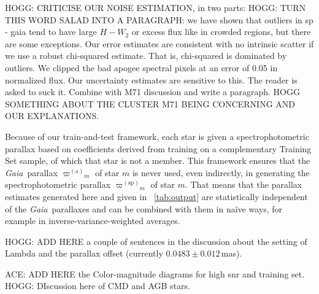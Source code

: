 \documentclass[modern]{aastex62}
\newcommand{\project}[1]{\textsl{#1}}
\newcommand{\gaia}{\project{Gaia}}
\newcommand{\gparallax}{{\varpi^{(\mathrm{a})}}}
\newcommand{\sparallax}{{\varpi^{(\mathrm{sp})}}}
\begin{document}
HOGG: CRITICISE OUR NOISE ESTIMATION, in two parts:
HOGG: TURN THIS WORD SALAD INTO A PARAGRAPH: we have shown that outliers in sp - gaia tend to have large $H-W_2$ or excess flux like in crowded regions, but there are some exceptions. Our error estimates are consistent with no intrinsic scatter if we use a robust chi-squared estimate. That is, chi-squared is dominated by outliers. We clipped the bad apogee spectral pixels at an error of 0.05 in normalized flux. Our uncertainty estimates are sensitive to this. The reader is asked to suck it. Combine with M71 discussion and write a paragraph.
HOGG SOMETHING ABOUT THE CLUSTER M71 BEING CONCERNING AND OUR EXPLANATIONS.

Because of our train-and-test framework, each star is given a spectrophotometric
parallax based on coefficients derived from training on a complementary Training Set sample, of
which that star is not a member.
This framework ensures that the \gaia\ parallax $\gparallax_m$ of star $m$ is never used,
even indirectly, in generating the spectrophotometric parallax $\sparallax_m$ of star $m$.
That means that the parallax estimates generated here and given in \tablename~\ref{tab:output}
are statistically independent of the \gaia\ parallaxes and can be combined with them in
na\"ive ways, for example in inverse-variance-weighted averages.

HOGG: ADD HERE a couple of sentences in the discussion about the setting of Lambda and the parallax offset (currently $0.0483\pm 0.012$\,mas).

ACE: ADD HERE the Color-magnitude diagrams for high snr and training set.
HOGG: DIscussion here of CMD and AGB stars.
\end{document}
